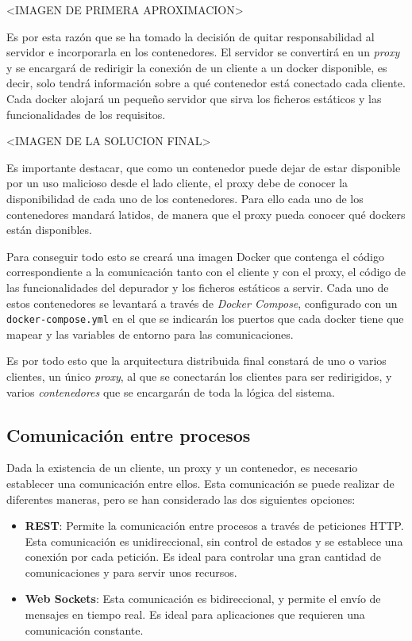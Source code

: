 <IMAGEN DE PRIMERA APROXIMACION>

Es por esta razón que se ha tomado la decisión de quitar responsabilidad al servidor e incorporarla en los contenedores. El servidor se convertirá en un \textit{proxy} y se encargará de redirigir la conexión de un cliente a un docker disponible, es decir, solo tendrá información sobre a qué contenedor está conectado cada cliente. 
Cada docker alojará un pequeño servidor que sirva los ficheros estáticos y las funcionalidades de los requisitos.

<IMAGEN DE LA SOLUCION FINAL>

Es importante destacar, que como un contenedor puede dejar de estar disponible por un uso malicioso desde el lado cliente, el proxy debe de conocer la disponibilidad de cada uno de los contenedores. Para ello cada uno de los contenedores mandará latidos, de manera que el proxy pueda conocer qué dockers están disponibles.

Para conseguir todo esto se creará una imagen Docker que contenga el código correspondiente a la comunicación tanto con el cliente y con el proxy, el código de las funcionalidades del depurador y los ficheros estáticos a servir.
Cada uno de estos contenedores se levantará a través de \textit{Docker Compose}, configurado con un \texttt{docker-compose.yml} en el que se indicarán los puertos que cada docker tiene que mapear y las variables de entorno para las comunicaciones. 

Es por todo esto que la arquitectura distribuida final constará de uno o varios clientes, un único \textit{proxy}, al que se conectarán los clientes para ser redirigidos, y varios \textit{contenedores} que se encargarán de toda la lógica del sistema.

\subsection{Comunicación entre procesos} \label{subsec:comunicacion-procesos}

Dada la existencia de un cliente, un proxy y un contenedor, es necesario establecer una comunicación entre ellos. Esta comunicación se puede realizar de diferentes maneras, pero se han considerado las dos siguientes opciones: 

\begin{itemize}
    \item \textbf{REST}: Permite la comunicación entre procesos a través de peticiones HTTP. Esta comunicación es unidireccional, sin control de estados y se establece una conexión por cada petición. Es ideal para controlar una gran cantidad de comunicaciones y para servir unos recursos.
    \item \textbf{Web Sockets}: Esta comunicación es bidireccional, y permite el envío de mensajes en tiempo real. Es ideal para aplicaciones que requieren una comunicación constante.
\end{itemize}

